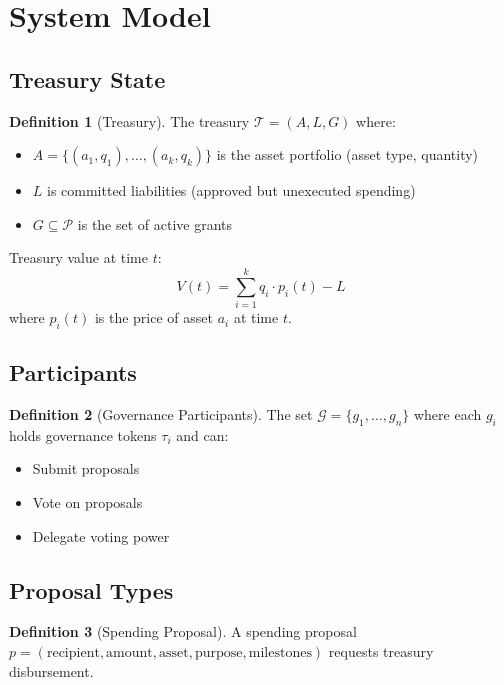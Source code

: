 \documentclass[11pt,a4paper]{article}
\theoremstyle{definition}
\newtheorem{definition}{Definition}[section]
\theoremstyle{remark}
\begin{document}
\section{System Model}

\subsection{Treasury State}

\begin{definition}[Treasury]
The treasury $\mathcal{T} = (A, L, G)$ where:
\begin{itemize}
    \item $A = \{(a_1, q_1), \ldots, (a_k, q_k)\}$ is the asset portfolio (asset type, quantity)
    \item $L$ is committed liabilities (approved but unexecuted spending)
    \item $G \subseteq \mathcal{P}$ is the set of active grants
\end{itemize}
\end{definition}

Treasury value at time $t$:
\begin{equation}
    V(t) = \sum_{i=1}^{k} q_i \cdot p_i(t) - L
\end{equation}
where $p_i(t)$ is the price of asset $a_i$ at time $t$.

\subsection{Participants}

\begin{definition}[Governance Participants]
The set $\mathcal{G} = \{g_1, \ldots, g_n\}$ where each $g_i$ holds governance tokens $\tau_i$ and can:
\begin{itemize}
    \item Submit proposals
    \item Vote on proposals
    \item Delegate voting power
\end{itemize}
\end{definition}

\subsection{Proposal Types}

\begin{definition}[Spending Proposal]
A spending proposal $p = (\text{recipient}, \text{amount}, \text{asset}, \text{purpose}, \text{milestones})$ requests treasury disbursement.
\end{definition}
\end{document}
